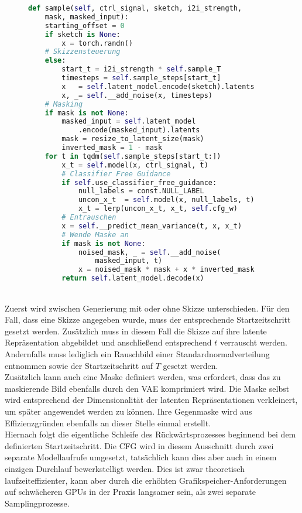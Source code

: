 \begin{figure}[htbp]
\begin{lstlisting}[language=python]
def sample(self, ctrl_signal, sketch, i2i_strength,
    mask, masked_input):
    starting_offset = 0
    if sketch is None:
        x = torch.randn()
    # Skizzensteuerung
    else:
        start_t = i2i_strength * self.sample_T
        timesteps = self.sample_steps[start_t]
        x   = self.latent_model.encode(sketch).latents
        x, _= self.__add_noise(x, timesteps)
    # Masking 
    if mask is not None:
        masked_input = self.latent_model
            .encode(masked_input).latents
        mask = resize_to_latent_size(mask)
        inverted_mask = 1 - mask
    for t in tqdm(self.sample_steps[start_t:])  
        x_t = self.model(x, ctrl_signal, t)
        # Classifier Free Guidance 
        if self.use_classifier_free_guidance:       
            null_labels = const.NULL_LABEL
            uncon_x_t  = self.model(x, null_labels, t)
            x_t = lerp(uncon_x_t, x_t, self.cfg_w)
        # Entrauschen
        x = self.__predict_mean_variance(t, x, x_t)        
        # Wende Maske an
        if mask is not None:
            noised_mask, _ = self.__add_noise(
                masked_input, t) 
            x = noised_mask * mask + x * inverted_mask
        return self.latent_model.decode(x)
\end{lstlisting}
    \captionsetup{type=figure}
    \label{fig:ldm_sample}
\end{figure} \\
Zuerst wird zwischen Generierung mit oder ohne Skizze unterschieden. Für den Fall, dass eine Skizze angegeben wurde, muss der entsprechende Startzeitschritt gesetzt werden. Zusätzlich muss in diesem Fall die Skizze auf ihre latente Repräsentation abgebildet und anschließend entsprechend $t$ verrauscht werden. Andernfalls muss lediglich ein Rauschbild einer Standardnormalverteilung entnommen sowie der Startzeitschritt auf $T$ gesetzt werden. \\ 
Zusätzlich kann auch eine Maske definiert werden, was erfordert, dass das zu maskierende Bild ebenfalls durch den \ac{VAE} komprimiert wird. Die Maske selbst wird entsprechend der Dimensionalität der latenten Repräsentationen verkleinert, um später angewendet werden zu können. Ihre Gegenmaske wird aus Effizienzgründen ebenfalls an dieser Stelle einmal erstellt. \\
Hiernach folgt die eigentliche Schleife des Rückwärtsprozesses beginnend bei dem definierten Startzeitschritt. Die \ac{CFG} wird in diesem Ausschnitt durch zwei separate Modellaufrufe umgesetzt, tatsächlich kann dies aber auch in einem einzigen Durchlauf bewerkstelligt werden. Dies ist zwar theoretisch laufzeiteffizienter, kann aber durch die erhöhten Grafikspeicher-Anforderungen auf schwächeren \ac{GPU}s in der Praxis langsamer sein, als zwei separate Samplingprozesse. \\
